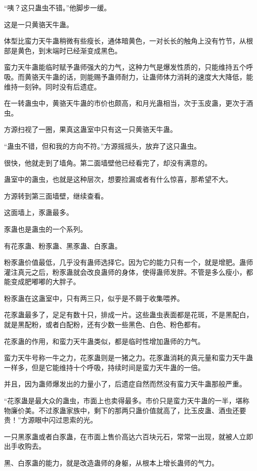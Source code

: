 \begin{this_body}
“咦？这只蛊虫不错。”他脚步一缓。

这是一只黄骆天牛蛊。

体型比蛮力天牛蛊稍微有些瘦长，通体暗黄色，一对长长的触角上没有竹节，从根部是黄色，到末端时已经渐变成黑色。

蛮力天牛蛊能临时赋予蛊师强大的力气，这种力气是爆发性质的，只能维持五个呼吸。而黄骆天牛蛊的话，则能赐予蛊师耐力，让蛊师体力消耗的速度大大降低，能维持一刻钟。同时没有后遗症。

在一转蛊虫中，黄骆天牛蛊的市价也颇高，和月光蛊相当，次于玉皮蛊，更次于酒虫。

方源扫视了一圈，果真这蛊室中只有这一只黄骆天牛蛊。

“蛊虫不错，但和我的方向不符。”方源摇摇头，放弃了这只蛊虫。

很快，他就走到了墙角。第二面墙壁他已经看完了，却没有满意的。

蛊室中的蛊虫，也就是这种层次，想要捡漏或者有什么惊喜，那希望不大。

方源转到第三面墙壁，继续查看。

这面墙上，豕蛊最多。

豕蛊也是蛊虫的一个系列。

有花豕蛊、粉豕蛊、黑豕蛊、白豕蛊。

粉豕蛊价值最低，几乎没有蛊师选择它。因为它的能力只有一个，就是增肥。蛊师灌注真元之后，粉豕蛊就会改良蛊师的身体，使得蛊师发胖。不管是多么瘦小，都能变成肥嘟嘟的大胖子。

粉豕蛊在这蛊室中，只有两三只，似乎是不屑于收集喂养。

花豕蛊最多了，足足有数十只，排成一片。这些蛊虫表面都是花斑，不是黑配白，就是黑配粉，或者白配粉，还有少数一些黑色、白色、粉色都有。

花豕蛊的作用，和蛮力天牛蛊类似，都是临时性增加蛊师的力气。

蛮力天牛号称一牛之力，花豕蛊则是一猪之力。花豕蛊消耗的真元量和蛮力天牛蛊一样多，但是它能维持十个呼吸，持续时间是蛮力天牛蛊的一倍。

并且，因为蛊师爆发出的力量小了，后遗症自然而然没有蛮力天牛蛊那般严重。

“花豕蛊是最大众的蛊虫，市面上也卖得最多。市价只是蛮力天牛蛊的一半，堪称物廉价美。不过豕蛊家族中，剩下的那两只蛊价值就高了，比玉皮蛊、酒虫还要贵！”方源眼中闪过思索的光。

一只黑豕蛊或者白豕蛊，在市面上售价高达六百块元石，常常一出现，就被人立即出手收购去。

黑、白豕蛊的能力，就是改造蛊师的身躯，从根本上增长蛊师的气力。


\end{this_body}

